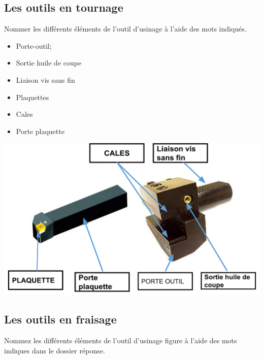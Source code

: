 \documentclass[12pt,a4paper]{article} %
\begin{document}
\subsection{Les outils en tournage}

\begin{exo} Nommer les différents  éléments de l’outil d’usinage à l'aide des mots
indiqués. \end{exo}
\begin{minipage}{.55\linewidth}
\begin{itemize}
    \item Porte-outil;
    \item Sortie huile de coupe
    \item Liaison vis sans fin
\end{itemize} 
\end{minipage}
\begin{minipage}{.44\linewidth}
\begin{itemize}
    \item Plaquettes
    \item Cales
    \item Porte plaquette
\end{itemize} 
\end{minipage}
\includegraphics[scale=0.75]{CORR4.png}

\newpage

\subsection{Les outils en fraisage}

\begin{exo} Nommez les différents éléments de l’outil d’usinage figure à l'aide des mots
indiques dans le dossier réponse. \end{exo}
\end{document}
